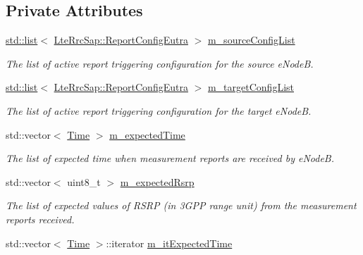 \subsection*{Private Attributes}
\begin{DoxyCompactItemize}
\item 
\hyperlink{openflow-interface_8h_afd9bcfa176617760671b67580f536fa7}{std\+::list}$<$ \hyperlink{structns3_1_1LteRrcSap_1_1ReportConfigEutra}{Lte\+Rrc\+Sap\+::\+Report\+Config\+Eutra} $>$ \hyperlink{classLteUeMeasurementsHandoverTestCase_a49bb851aed531dfbf9a9e88284c4f0ef}{m\+\_\+source\+Config\+List}
\begin{DoxyCompactList}\small\item\em The list of active report triggering configuration for the source e\+NodeB. \end{DoxyCompactList}\item 
\hyperlink{openflow-interface_8h_afd9bcfa176617760671b67580f536fa7}{std\+::list}$<$ \hyperlink{structns3_1_1LteRrcSap_1_1ReportConfigEutra}{Lte\+Rrc\+Sap\+::\+Report\+Config\+Eutra} $>$ \hyperlink{classLteUeMeasurementsHandoverTestCase_ab87f6d3138c51c5996947ef91e25a1b8}{m\+\_\+target\+Config\+List}
\begin{DoxyCompactList}\small\item\em The list of active report triggering configuration for the target e\+NodeB. \end{DoxyCompactList}\item 
std\+::vector$<$ \hyperlink{classns3_1_1Time}{Time} $>$ \hyperlink{classLteUeMeasurementsHandoverTestCase_a3d9400d416e518e007955fff996b602d}{m\+\_\+expected\+Time}
\begin{DoxyCompactList}\small\item\em The list of expected time when measurement reports are received by e\+NodeB. \end{DoxyCompactList}\item 
std\+::vector$<$ uint8\+\_\+t $>$ \hyperlink{classLteUeMeasurementsHandoverTestCase_ad5e8838ca7085c4c64b0483709da1332}{m\+\_\+expected\+Rsrp}
\begin{DoxyCompactList}\small\item\em The list of expected values of R\+S\+RP (in 3\+G\+PP range unit) from the measurement reports received. \end{DoxyCompactList}\item 
std\+::vector$<$ \hyperlink{classns3_1_1Time}{Time} $>$\+::iterator \hyperlink{classLteUeMeasurementsHandoverTestCase_a95dfbfd7799a6d05744eb034fc490bb3}{m\+\_\+it\+Expected\+Time}

\end{DoxyCompactItemize}
